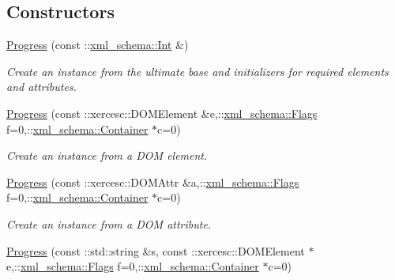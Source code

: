 \subsection*{Constructors}
\begin{DoxyCompactItemize}
\item 
\hypertarget{classopenstack_1_1xml_1_1Progress_a284b101defb645e8e4c1dca48a81d4dd}{
\hyperlink{classopenstack_1_1xml_1_1Progress_a284b101defb645e8e4c1dca48a81d4dd}{Progress} (const ::\hyperlink{namespacexml__schema_a12d975a13061c938969b2b5143e97645}{xml\_\-schema::Int} \&)}
\label{classopenstack_1_1xml_1_1Progress_a284b101defb645e8e4c1dca48a81d4dd}

\begin{DoxyCompactList}\small\item\em Create an instance from the ultimate base and initializers for required elements and attributes. \item\end{DoxyCompactList}\item 
\hyperlink{classopenstack_1_1xml_1_1Progress_a103cec3f225e4a069accb032e7098957}{Progress} (const ::xercesc::DOMElement \&e,::\hyperlink{namespacexml__schema_affb4c227cbd9aa7453dd1dc5a1401943}{xml\_\-schema::Flags} f=0,::\hyperlink{namespacexml__schema_a333dea2213742aea47a37532dec4ec27}{xml\_\-schema::Container} $\ast$c=0)
\begin{DoxyCompactList}\small\item\em Create an instance from a DOM element. \item\end{DoxyCompactList}\item 
\hyperlink{classopenstack_1_1xml_1_1Progress_acfff2c4ac51001f039f3b1e6f0902ba8}{Progress} (const ::xercesc::DOMAttr \&a,::\hyperlink{namespacexml__schema_affb4c227cbd9aa7453dd1dc5a1401943}{xml\_\-schema::Flags} f=0,::\hyperlink{namespacexml__schema_a333dea2213742aea47a37532dec4ec27}{xml\_\-schema::Container} $\ast$c=0)
\begin{DoxyCompactList}\small\item\em Create an instance from a DOM attribute. \item\end{DoxyCompactList}\item 
\hyperlink{classopenstack_1_1xml_1_1Progress_a111d76ff9ae06f6bf20d9f502d1840be}{Progress} (const ::std::string \&s, const ::xercesc::DOMElement $\ast$e,::\hyperlink{namespacexml__schema_affb4c227cbd9aa7453dd1dc5a1401943}{xml\_\-schema::Flags} f=0,::\hyperlink{namespacexml__schema_a333dea2213742aea47a37532dec4ec27}{xml\_\-schema::Container} $\ast$c=0)

\end{DoxyCompactItemize}
